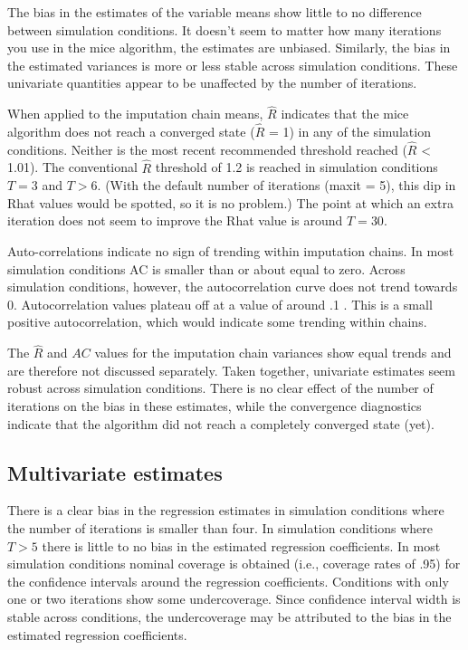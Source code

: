 \documentclass[Royal,times,sageh]{sagej}
\begin{document}
The bias in the estimates of the variable means show little to no
difference between simulation conditions. It doesn't seem to matter how
many iterations you use in the mice algorithm, the estimates are
unbiased. Similarly, the bias in the estimated variances is more or less
stable across simulation conditions. These univariate quantities appear
to be unaffected by the number of iterations.

When applied to the imputation chain means, \(\widehat{R}\) indicates
that the mice algorithm does not reach a converged state
(\(\widehat{R}\) = 1) in any of the simulation conditions. Neither is
the most recent recommended threshold reached (\(\widehat{R}\)
\textless{} 1.01). The conventional \(\widehat{R}\) threshold of 1.2 is
reached in simulation conditions \(T = 3\) and \(T > 6\). (With the
default number of iterations (maxit = 5), this dip in Rhat values would
be spotted, so it is no problem.) The point at which an extra iteration
does not seem to improve the Rhat value is around \(T=30\).

Auto-correlations indicate no sign of trending within imputation chains.
In most simulation conditions AC is smaller than or about equal to zero.
Across simulation conditions, however, the autocorrelation curve does
not trend towards 0. Autocorrelation values plateau off at a value of
around .1 . This is a small positive autocorrelation, which would
indicate some trending within chains.

The \(\widehat{R}\) and \(AC\) values for the imputation chain variances
show equal trends and are therefore not discussed separately. Taken
together, univariate estimates seem robust across simulation conditions.
There is no clear effect of the number of iterations on the bias in
these estimates, while the convergence diagnostics indicate that the
algorithm did not reach a completely converged state (yet).

\hypertarget{multivariate-estimates}{%
\subsection{Multivariate estimates}\label{multivariate-estimates}}

There is a clear bias in the regression estimates in simulation
conditions where the number of iterations is smaller than four. In
simulation conditions where \(T > 5\) there is little to no bias in the
estimated regression coefficients. In most simulation conditions nominal
coverage is obtained (i.e., coverage rates of .95) for the confidence
intervals around the regression coefficients. Conditions with only one
or two iterations show some undercoverage. Since confidence interval
width is stable across conditions, the undercoverage may be attributed
to the bias in the estimated regression coefficients.
\end{document}
